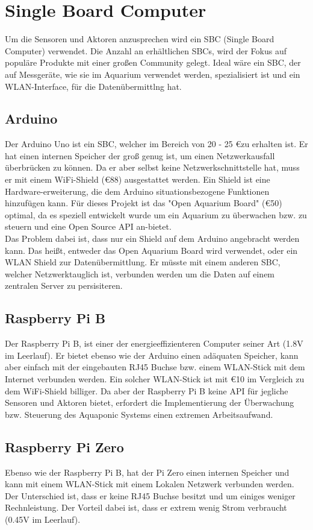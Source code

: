 \documentclass[11pt]{article}
\begin{document}
\newpage
\section{Single Board Computer}
Um die Sensoren und Aktoren anzusprechen wird ein SBC (Single Board Computer) verwendet. Die Anzahl an erh\"altlichen SBCs, wird der Fokus auf popul\"are Produkte mit einer gro{\ss}en Community gelegt. Ideal w\"are ein SBC, der auf Messger\"ate, wie sie im Aquarium verwendet werden, spezialisiert ist und ein WLAN-Interface, f\"ur die Daten\"ubermittlng hat.

\subsection{Arduino}
Der Arduino Uno ist ein SBC, welcher im Bereich von 20 - 25 \euro zu erhalten ist. Er hat einen internen Speicher der gro{\ss} genug ist, um einen Netzwerkausfall \"uberbr\"ucken zu k\"onnen. Da er aber selbst keine Netzwerkschnittstelle hat, muss er mit einem WiFi-Shield (\euro 88) ausgestattet werden. Ein Shield ist eine Hardware-erweiterung, die dem Arduino situationsbezogene Funktionen hinzuf\"ugen kann. F\"ur dieses Projekt ist das "Open Aquarium Board" (\euro 50) optimal, da es speziell entwickelt wurde um ein Aquarium zu \"uberwachen bzw. zu steuern und eine Open Source API an-bietet. \\
Das Problem dabei ist, dass nur ein Shield auf dem Arduino angebracht werden kann. Das hei{\ss}t, entweder das Open Aquarium Board wird verwendet, oder ein WLAN Shield zur Daten\"ubermittlung. Er m\"usste mit einem anderen SBC, welcher Netzwerktauglich ist, verbunden werden um die Daten auf einem zentralen Server zu persisiteren.
\subsection{Raspberry Pi B}
Der Raspberry Pi B, ist einer der energieeffizienteren Computer seiner Art (1.8V im Leerlauf). Er bietet ebenso wie der Arduino einen ad\"aquaten Speicher, kann aber einfach mit der eingebauten RJ45 Buchse bzw. einem WLAN-Stick mit dem Internet verbunden werden. Ein solcher WLAN-Stick ist mit \euro 10 im Vergleich zu dem WiFi-Shield billiger. Da aber der Raspberry Pi B keine API f\"ur jegliche Sensoren und Aktoren bietet, erfordert die Implementierung der \"Uberwachung bzw. Steuerung des Aquaponic Systems einen extremen Arbeitsaufwand.
\newpage
\subsection{Raspberry Pi Zero}
Ebenso wie der Raspberry Pi B, hat der Pi Zero einen internen Speicher und kann mit einem WLAN-Stick mit einem Lokalen Netzwerk verbunden werden. Der Unterschied ist, dass er keine RJ45 Buchse besitzt und um einiges weniger Rechnleistung. Der Vorteil dabei ist, dass er extrem wenig Strom verbraucht (0.45V im Leerlauf).
\end{document}
